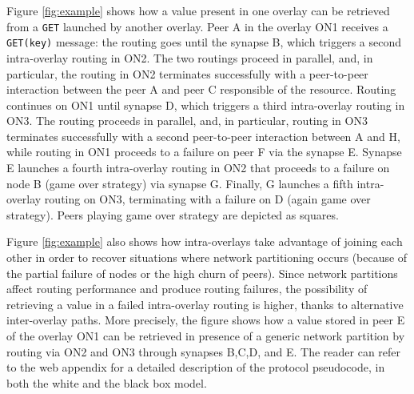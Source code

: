 %
Figure \ref{fig:example} shows how a value present in one overlay can
be retrieved from a {\tt GET} launched by another overlay. Peer A in
the overlay ON1 receives a {\tt GET(key)} message: the routing goes
until the synapse B, which triggers a second intra-overlay routing in
ON2. The two routings proceed in parallel, and, in particular, the
routing in ON2 terminates successfully with a peer-to-peer interaction
between the peer A and peer C responsible of the resource. Routing
continues on ON1 until synapse D, which triggers a third
intra-overlay routing in ON3. The routing proceeds in parallel, and, in
particular, routing in ON3 terminates successfully with a second
peer-to-peer interaction between A and H, while routing in ON1
proceeds to a failure on peer F via the synapse E. Synapse E
launches a fourth intra-overlay routing in ON2 that proceeds to a
failure on node B (game over strategy) via synapse G. Finally, G
launches a fifth intra-overlay routing on ON3, terminating with a
failure on D (again game over strategy). Peers playing game over
strategy are depicted as squares.

%
Figure \ref{fig:example} also shows how intra-overlays take
advantage of joining each other in order to recover situations where
network partitioning occurs (because of the partial failure of nodes or the high
churn of peers). Since network partitions affect routing performance and
produce routing failures, the possibility of retrieving a value in a
failed intra-overlay routing is higher, thanks to alternative
inter-overlay paths. More precisely, the figure shows how a value
stored in peer E of the overlay ON1 can be retrieved in presence
of a generic network partition by routing via ON2 and ON3 through
synapses B,C,D, and E.  The reader can refer to the web appendix for
a detailed description of the protocol pseudocode, in both the white and
the black box model.

